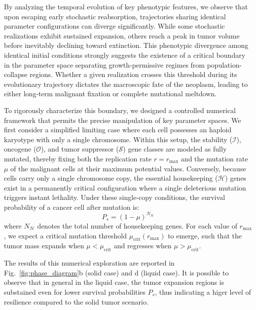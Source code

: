 \documentclass[10pt, aps, rmp,  twocolumn, superscriptaddress, floatfix, showkeys]{revtex4-2}
\begin{document}
By analyzing the temporal evolution of key phenotypic features, we observe that upon escaping early stochastic reabsorption, trajectories sharing identical parameter configurations can diverge significantly. While some stochastic realizations exhibit sustained expansion, others reach a peak in tumor volume before inevitably declining toward extinction. This phenotypic divergence among identical initial conditions strongly suggests the existence of a critical boundary in the parameter space separating growth-permissive regimes from population-collapse regions. Whether a given realization crosses this threshold during its evolutionary trajectory dictates the macroscopic fate of the neoplasm, leading to either long-term malignant fixation or complete mutational meltdown.


To rigorously characterize this boundary, we designed a controlled numerical framework that permits the precise manipulation of key parameter spaces. 
We first consider a simplified limiting case where each cell possesses an haploid karyotype with only a single chromosome.
Within this setup, the stability ($\mathcal{I}$), oncogene ($\mathcal{O}$), and tumor suppressor ($\mathcal{S}$) gene classes are modeled as fully mutated, thereby fixing both the replication rate $r=r_{\text{max}}$ and the mutation rate $\mu$ of the malignant cells at their maximum potential values. Conversely, because cells carry only a single chromosome copy, the essential housekeeping ($\mathcal{H}$) genes exist in a permanently critical configuration where a single deleterious mutation triggers instant lethality. Under these single-copy conditions, the survival probability of a cancer cell after mutation is:
$$
P_s = (1 - \mu)^{N_{\mathcal{H}}}
$$
where $N_{\mathcal{H}}$ denotes the total number of housekeeping genes. For each value of $r_{\text{max}}$, we expect a critical mutation threshold $\mu_{\text{crit}}(r_{\text{max}})$ to emerge, such that the tumor mass expands when $\mu < \mu_{\text{crit}}$ and regresses when $\mu > \mu_{\text{crit}}$.

The results of this numerical exploration are reported in Fig.~\ref{fig:phase_diagram}b (solid case) and d (liquid case). It is possible to observe that in general in the liquid case, the tumor expansion regions is substained even for lower survival probabilities $P_s$, thus indicating a higer level of resilience compared to the solid tumor scenario. 
\end{document}
